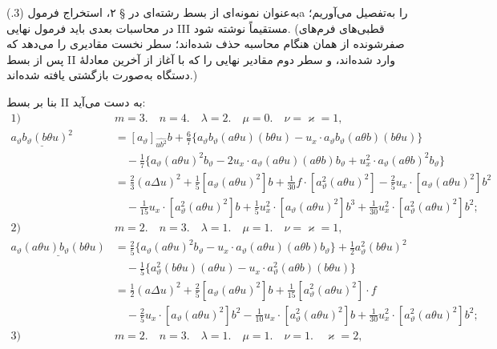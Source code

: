 \documentclass[11pt]{article}
\providecommand{\A}{\Delta}
\begin{document}
به‌عنوان نمونه‌ای از بسط رشته‌ای در § ۲، استخراج فرمول (3.)a را به‌تفصیل می‌آوریم؛ در محاسبات بعدی باید فرمول نهایی III مستقیماً نوشته شود. (قطبی‌های فرم‌های صفرشونده از همان هنگام محاسبه حذف شده‌اند؛ سطر نخست مقادیری را می‌دهد که پس از بسط II وارد شده‌اند، و سطر دوم مقادیر نهایی را که با آغاز از آخرین معادلهٔ دستگاه به‌صورت بازگشتی یافته شده‌اند.)

بنا بر بسط II به دست می‌آید:
\[
\begin{aligned}
\text{1)}\quad&m=3.\quad n=4.\quad \lambda=2.\quad \mu=0.\quad \nu=\varkappa=1,\\[0.25em]
\underline{a_\vartheta b_\vartheta(b\theta u)^2}
&=[a_\vartheta]_{\widehat{ub^2}}b+\frac67\{a_\vartheta b_\vartheta(a\theta u)(b\theta u)-u_x\cdot a_\vartheta b_\vartheta(a\theta b)(b\theta u)\}\\
&\quad-\frac17\{a_\vartheta(a\theta u)^2b_\vartheta-2u_x\cdot a_\vartheta(a\theta u)(a\theta b)b_\vartheta+u_x^2\cdot a_\vartheta(a\theta b)^2b_\vartheta\}\\
&=\frac23(a\A u)^2+\frac15[a_\vartheta(a\theta u)^2]b+\frac1{30}f\cdot[a_\vartheta^2(a\theta u)^2]-\frac25u_x\cdot[a_\vartheta(a\theta u)^2]b^2\\
&\quad-\frac1{15}u_x\cdot[a_\vartheta^2(a\theta u)^2]b+\frac15u_x^2\cdot[a_\vartheta(a\theta u)^2]b^3+\frac1{30}u_x^2\cdot[a_\vartheta^2(a\theta u)^2]b^2;\\[0.7em]
\text{2)}\quad&m=2.\quad n=3.\quad \lambda=1.\quad \mu=1.\quad \nu=\varkappa=1,\\[0.25em]
\underline{a_\vartheta(a\theta u)b_\vartheta(b\theta u)}
&=\frac25\{a_\vartheta(a\theta u)^2b_\vartheta-u_x\cdot a_\vartheta(a\theta u)(a\theta b)b_\vartheta\}+\frac12a_\vartheta^2(b\theta u)^2\\
&\quad-\frac15\{a_\vartheta^2(b\theta u)(a\theta u)-u_x\cdot a_\vartheta^2(a\theta b)(b\theta u)\}\\
&=\frac12(a\A u)^2+\frac25[a_\vartheta(a\theta u)^2]b+\frac1{15}[a_\vartheta^2(a\theta u)^2]\cdot f\\
&\quad-\frac25u_x\cdot[a_\vartheta(a\theta u)^2]b^2-\frac1{10}u_x\cdot[a_\vartheta^2(a\theta u)^2]b+\frac1{30}u_x^2\cdot[a_\vartheta^2(a\theta u)^2]b^2;\\[0.7em]
\text{3)}\quad&m=2.\quad n=3.\quad \lambda=1.\quad \mu=1.\quad \nu=1.\quad \varkappa=2,
\end{aligned}
\]
\end{document}
